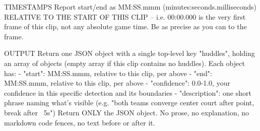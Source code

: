 TIMESTAMPS
Report start/end as MM:SS.mmm (minutes:seconds.milliseconds) RELATIVE TO
THE START OF THIS CLIP -- i.e. 00:00.000 is the very first frame of this
clip, not any absolute game time. Be as precise as you can to the frame.

OUTPUT
Return one JSON object with a single top-level key "huddles", holding an
array of objects (empty array if this clip contains no huddles). Each
object has:
  - "start": MM:SS.mmm, relative to this clip, per above
  - "end": MM:SS.mmm, relative to this clip, per above
  - "confidence": 0.0-1.0, your confidence in this specific detection and
    its boundaries
  - "description": one short phrase naming what's visible (e.g. "both
    teams converge center court after point, break after ~5s")
Return ONLY the JSON object. No prose, no explanation, no markdown code
fences, no text before or after it.